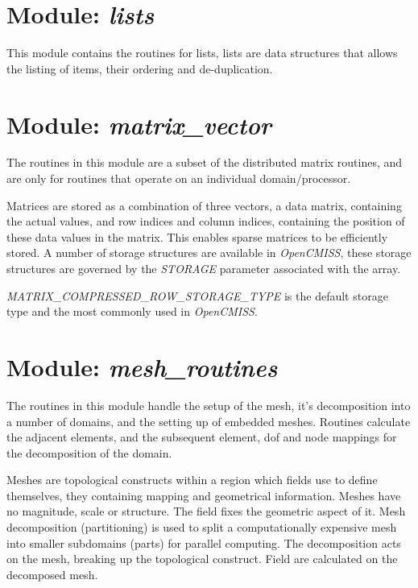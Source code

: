 \section{Module: \emph{lists}}
\label{sec:lists}

This module contains the routines for lists, lists are data structures that 
allows the listing of items, their ordering and de-duplication.


\section{Module: \emph{matrix\_vector}}
\label{sec:matrixvector}

The routines in this module are a subset of the distributed matrix routines, 
and are only for routines that operate on an individual domain/processor.

Matrices are stored as a combination of three vectors, a data matrix, 
containing the actual values, and row indices and column indices, containing 
the position of these data values in the matrix. This enables sparse 
matrices to be efficiently stored. A number of storage structures are 
available in \emph{OpenCMISS}, these storage structures are governed by the 
\emph{STORAGE} parameter associated with the array. 

\emph{MATRIX\_COMPRESSED\_ROW\_STORAGE\_TYPE} is the default storage type 
and the most commonly used in \emph{OpenCMISS}.


\section{Module: \emph{mesh\_routines}}
\label{sec:meshroutines}

The routines in this module handle the setup of the mesh, it's decomposition 
into a number of domains, and the setting up of embedded meshes. Routines 
calculate the adjacent elements, and the subsequent element, dof and node 
mappings for the decomposition of the domain.

Meshes are topological constructs within a region which fields use to define
themselves, they containing mapping and geometrical information. Meshes have 
no magnitude, scale or structure. The field fixes the geometric aspect of it. 
Mesh decomposition (partitioning) is used to split a computationally 
expensive mesh into smaller subdomains (parts) for parallel computing. The 
decomposition acts on the mesh, breaking up the topological construct. Field 
are calculated on the decomposed mesh. 

